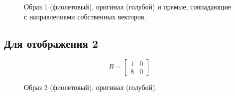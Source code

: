 \documentclass[a5paper, 10pt]{article}
\theoremstyle{definition}
\theoremstyle{plain}
\theoremstyle{remark}
\begin{document}
\begin{figure}[h]
\caption{Образ 1 (фиолетовый), оригинал (голубой) и прямые, совпадающие с направлениями собственных векторов.}
\end{figure}


\newpage
\subsection{Для отображения 2}
\begin{equation}
B =
\begin{bmatrix}
1 & 0\\
8 & 0
\end{bmatrix}
\end{equation}

\begin{figure}[h]
\caption{Образ 2 (фиолетовый), оригинал (голубой).}
\end{figure}
\end{document}
